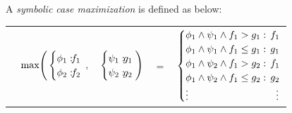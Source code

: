 \documentclass{article} %
\begin{document}
A \emph{symbolic case maximization} is defined as below:
\vspace{-4mm}
{\footnotesize
\vspace{-2mm}
\begin{center}
\begin{tabular}{r c c c l}
&
\hspace{-7mm} $\mathrm{max} \Bigg(
  \begin{cases}
    \phi_1: \hspace{-2mm} & \hspace{-2mm} f_1 \\ 
    \phi_2: \hspace{-2mm} & \hspace{-2mm} f_2 \\ 
  \end{cases}$
$,$
&
\hspace{-4mm}
  $\begin{cases}
    \psi_1: \hspace{-2mm} & \hspace{-2mm} g_1 \\ 
    \psi_2: \hspace{-2mm} & \hspace{-2mm} g_2 \\ 
  \end{cases} \Bigg)$
&
\hspace{-4mm} 
$ = $
&
\hspace{-4mm}
  $\begin{cases}
  \phi_1 \wedge \psi_1 \wedge f_1 > g_1    : & \hspace{-2mm} f_1 \\ 
  \phi_1 \wedge \psi_1 \wedge f_1 \leq g_1 : & \hspace{-2mm} g_1 \\ 
  \phi_1 \wedge \psi_2 \wedge f_1 > g_2    : & \hspace{-2mm}f_1 \\ 
  \phi_1 \wedge \psi_2 \wedge f_1 \leq g_2 : & \hspace{-2mm} g_2 \\ 
  \vdots & \vdots
  \end{cases}$
\end{tabular}
\end{center}
\vspace{-3mm}
}
\end{document}
